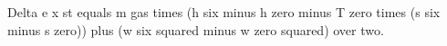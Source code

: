 Delta e x st equals m gas times (h six minus h zero minus T zero times (s six minus s zero)) plus (w six squared minus w zero squared) over two.